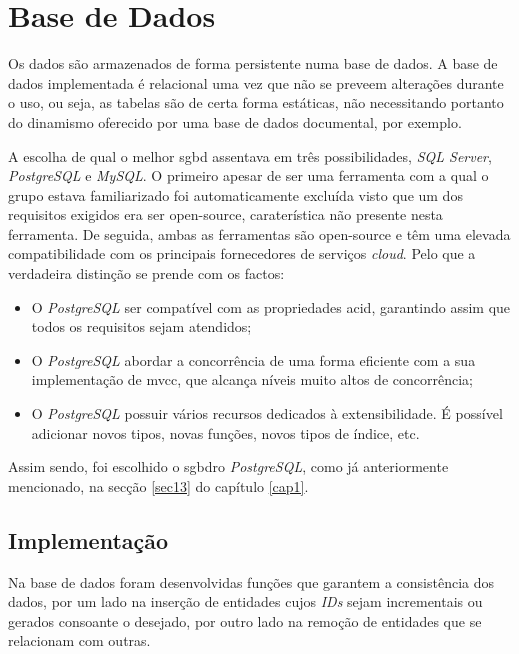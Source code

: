 %
%
\section{Base de Dados}\label{sec32}

Os dados são armazenados de forma persistente numa base de dados. A base de dados implementada é relacional uma vez que não se preveem alterações durante o uso, ou seja, as tabelas são de certa forma estáticas, não necessitando portanto do dinamismo oferecido por uma base de dados documental, por exemplo. 

 A escolha de qual o melhor \acrshort{sgbd} assentava em três possibilidades, \textit{SQL Server}, \textit{PostgreSQL} e \textit{MySQL}. O primeiro apesar de ser uma ferramenta com a qual o grupo estava familiarizado foi automaticamente excluída visto que um dos requisitos exigidos era ser \gls{open-source}, caraterística não presente nesta ferramenta. De seguida, ambas as ferramentas são \gls{open-source} e têm uma elevada compatibilidade com os principais fornecedores de serviços \textit{cloud}. Pelo que a verdadeira distinção se prende com os factos:
 	\begin{itemize}
 		\item O \textit{PostgreSQL} ser compatível com as propriedades \acrfull{acid}, garantindo assim que todos os requisitos sejam atendidos;
 		\item O \textit{PostgreSQL} abordar a concorrência de uma forma eficiente com a sua implementação de \acrfull{mvcc}, que alcança níveis muito altos de concorrência;
 		\item O \textit{PostgreSQL} possuir vários recursos dedicados à extensibilidade. É possível adicionar novos tipos, novas funções, novos tipos de índice, etc.
	\end{itemize}
 Assim sendo, foi escolhido o \acrfull{sgbdro} \textit{PostgreSQL}, como já anteriormente mencionado, na secção \ref{sec13} do capítulo \ref{cap1}.
 
 \subsection{Implementação}\label{subsec321}
 
Na base de dados foram desenvolvidas funções que garantem a consistência dos dados, por um lado na inserção de entidades cujos \textit{IDs} sejam incrementais ou gerados consoante o desejado, por outro lado na remoção  de entidades que se relacionam com outras.